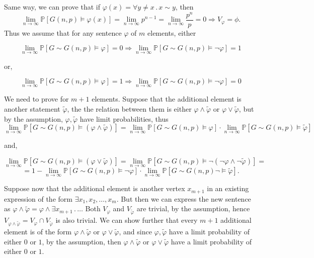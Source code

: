 \documentclass{article}
\begin{document}
Same way, we can prove that if $\varphi(x)=\forall{y\neq{x}}\,.\,x\sim{y}$, then \[\lim_{n\rightarrow\infty}\mathbb{P}[G(n,p)\vDash\varphi(x)]=\lim_{n\rightarrow\infty}p^{n-1}=\lim_{n\rightarrow\infty}\frac{p^n}{p}=0\Rightarrow{V_\varphi=\phi}.\]
Thus we assume that for any sentence $\varphi$ of $m$ elements, either

\[\lim_{n\rightarrow\infty}\mathbb{P}[G\sim{G(n,p)\vDash\varphi}]=0\Rightarrow\lim_{n\rightarrow\infty}\mathbb{P}[G\sim{G(n,p)\vDash\neg\varphi}]=1\]

or,

\[\lim_{n\rightarrow\infty}\mathbb{P}[G\sim{G(n,p)\vDash\varphi}]=1\Rightarrow\lim_{n\rightarrow\infty}\mathbb{P}[G\sim{G(n,p)\vDash\neg\varphi}]=0\]

We need to prove for $m+1$ elements. Suppose that the additional element is another statement $\tilde\varphi$, the the relation between them is either $\varphi\land\tilde\varphi$ or $\varphi\lor\tilde\varphi$, but by the assumption, $\varphi,\tilde\varphi$ have limit probabilities, thus \[\lim_{n\rightarrow\infty
}\mathbb{P}[G\sim{G(n,p)}\vDash(\varphi\land\tilde\varphi)]=\lim_{n\rightarrow\infty
}\mathbb{P}[G\sim{G(n,p)}\vDash\varphi]\cdot\lim_{n\rightarrow\infty
}\mathbb{P}[G\sim{G(n,p)}\vDash\tilde\varphi]\]

and,

\[\lim_{n\rightarrow\infty
}\mathbb{P}[G\sim{G(n,p)}\vDash(\varphi\lor\tilde\varphi)]=\lim_{n\rightarrow\infty
}\mathbb{P}[G\sim{G(n,p)}\vDash\neg(\neg\varphi\land\neg\tilde\varphi)]=\]\[=1-\lim_{n\rightarrow\infty
}\mathbb{P}[G\sim{G(n,p)}\vDash\neg\varphi]\cdot\lim_{n\rightarrow\infty
}\mathbb{P}[G\sim{G(n,p)}\neg\vDash\tilde\varphi].\]

Suppose now that the additional element is another vertex $x_{m+1}$ in an existing expression of the form $\exists{x_1,x_2,\dots,x_m}$. But then we can express the new sentence as $\varphi\land\tilde\varphi=\varphi\land\exists{x_{m+1}}\,.\,\dots$
Both $V_\varphi$ and $V_{\tilde\varphi}$ are trivial, by the assumption, hence $V_{\varphi\land\tilde\varphi}=V_\varphi\cap{V_{\tilde\varphi}}$ is also trivial.
We can show further that every $m+1$ additional element is of the form $\varphi\land\tilde\varphi$ or $\varphi\lor\tilde\varphi$, and since $\varphi,\tilde\varphi$ have a limit probability of either $0$ or $1$, by the assumption, then $\varphi\land\tilde\varphi$ or $\varphi\lor\tilde\varphi$ have a limit probability of either $0$ or $1$.
\end{document}
